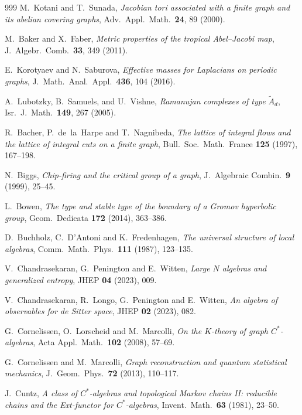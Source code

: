 \begin{thebibliography}{999}
 M.~Kotani and T.~Sunada, \emph{Jacobian tori associated with a finite graph and its abelian covering graphs}, Adv.\ Appl.\ Math.\ \textbf{24}, 89 (2000).

 M.~Baker and X.~Faber, \emph{Metric properties of the tropical Abel--Jacobi map}, J.\ Algebr.\ Comb.\ \textbf{33}, 349 (2011).

 E.~Korotyaev and N.~Saburova, \emph{Effective masses for Laplacians on periodic graphs}, J.\ Math.\ Anal.\ Appl.\ \textbf{436}, 104 (2016).

 A.~Lubotzky, B.~Samuels, and U.~Vishne, \emph{Ramanujan complexes of type $\widetilde A_d$}, Isr.\ J.\ Math.\ \textbf{149}, 267 (2005).

 R.~Bacher, P.~de~la~Harpe and T.~Nagnibeda, \emph{The lattice of integral flows and the lattice of integral cuts on a finite graph}, Bull.\ Soc.\ Math.\ France \textbf{125} (1997), 167--198.

 N.~Biggs, \emph{Chip-firing and the critical group of a graph}, J.\ Algebraic Combin.\ \textbf{9} (1999), 25--45.

 L.~Bowen, \emph{The type and stable type of the boundary of a Gromov hyperbolic group}, Geom.\ Dedicata \textbf{172} (2014), 363--386.

 D.~Buchholz, C.~D'Antoni and K.~Fredenhagen, \emph{The universal structure of local algebras}, Comm.\ Math.\ Phys.\ \textbf{111} (1987), 123--135.

 V.~Chandrasekaran, G.~Penington and E.~Witten, \emph{Large $N$ algebras and generalized entropy}, JHEP \textbf{04} (2023), 009.

 V.~Chandrasekaran, R.~Longo, G.~Penington and E.~Witten, \emph{An algebra of observables for de Sitter space}, JHEP \textbf{02} (2023), 082.

 G.~Cornelissen, O.~Lorscheid and M.~Marcolli, \emph{On the $K$-theory of graph $C^*$-algebras}, Acta Appl.\ Math.\ \textbf{102} (2008), 57--69.

 G.~Cornelissen and M.~Marcolli, \emph{Graph reconstruction and quantum statistical mechanics}, J.\ Geom.\ Phys.\ \textbf{72} (2013), 110--117.

 J.~Cuntz, \emph{A class of $C^*$-algebras and topological Markov chains II: reducible chains and the Ext-functor for $C^*$-algebras}, Invent.\ Math.\ \textbf{63} (1981), 23--50.


\end{thebibliography}
